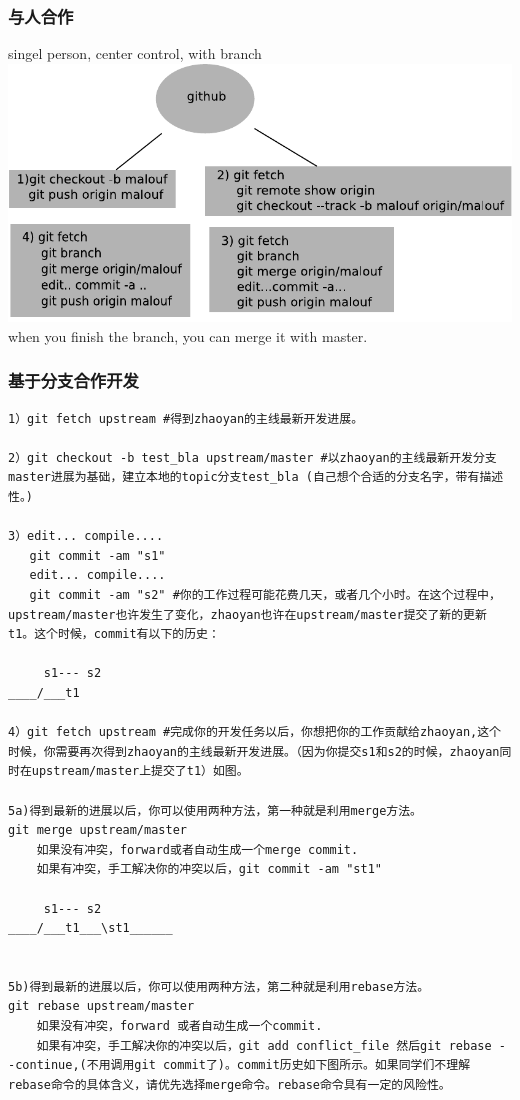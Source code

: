 \documentclass[a4paper,12pt,twoside]{book}
\begin{document}
\begin{CJK*}{UTF8}{song}
\subsubsection{与人合作}
singel person, center control, with branch \\
	\includegraphics[scale=0.6]{pics/git_branch} \\
   	when you finish the branch, you can merge it with master.

\subsubsection{基于分支合作开发}
\begin{verbatim}
1）git fetch upstream #得到zhaoyan的主线最新开发进展。

2）git checkout -b test_bla upstream/master #以zhaoyan的主线最新开发分支master进展为基础，建立本地的topic分支test_bla (自己想个合适的分支名字，带有描述性。)

3）edit... compile....
   git commit -am "s1"
   edit... compile....
   git commit -am "s2" #你的工作过程可能花费几天，或者几个小时。在这个过程中，upstream/master也许发生了变化，zhaoyan也许在upstream/master提交了新的更新t1。这个时候，commit有以下的历史：

     s1--- s2
____/___t1

4）git fetch upstream #完成你的开发任务以后，你想把你的工作贡献给zhaoyan,这个时候，你需要再次得到zhaoyan的主线最新开发进展。（因为你提交s1和s2的时候，zhaoyan同时在upstream/master上提交了t1）如图。

5a)得到最新的进展以后，你可以使用两种方法，第一种就是利用merge方法。
git merge upstream/master
	如果没有冲突，forward或者自动生成一个merge commit.
	如果有冲突，手工解决你的冲突以后，git commit -am "st1"

     s1--- s2
____/___t1___\st1______


5b)得到最新的进展以后，你可以使用两种方法，第二种就是利用rebase方法。
git rebase upstream/master
	如果没有冲突，forward 或者自动生成一个commit.
	如果有冲突，手工解决你的冲突以后，git add conflict_file 然后git rebase --continue,(不用调用git commit了)。commit历史如下图所示。如果同学们不理解rebase命令的具体含义，请优先选择merge命令。rebase命令具有一定的风险性。


\end{verbatim}
\end{CJK*}
\end{document}
